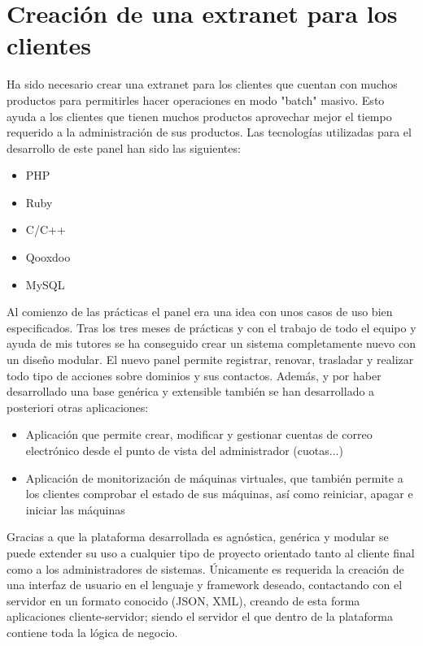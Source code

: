 \documentclass[12pt]{article}
\begin{document}
  \section{Creación de una extranet para los clientes}
    Ha sido necesario crear una extranet para los clientes que cuentan con muchos productos para
    permitirles hacer operaciones en modo "batch" masivo. Esto ayuda a los clientes que tienen
    muchos productos aprovechar mejor el tiempo requerido a la administración de sus productos.
    Las tecnologías utilizadas para el desarrollo de este panel han sido las siguientes:
    \begin{itemize}
      \item PHP
      \item Ruby
      \item C/C++
      \item Qooxdoo
      \item MySQL
    \end{itemize}
    Al comienzo de las prácticas el panel era una idea con unos casos de uso bien especificados.
    Tras los tres meses de prácticas y con el trabajo de todo el equipo y ayuda de mis tutores se
    ha conseguido crear un sistema completamente nuevo con un diseño modular.
    El nuevo panel permite registrar, renovar, trasladar y realizar todo tipo de acciones sobre
    dominios y sus contactos. Además, y por haber desarrollado una base genérica y extensible
    también se han desarrollado a posteriori otras aplicaciones:
    \begin{itemize}
      \item Aplicación que permite crear, modificar y gestionar cuentas de correo electrónico desde
            el punto de vista del administrador (cuotas...)
      \item Aplicación de monitorización de máquinas virtuales, que también permite a los clientes
            comprobar el estado de sus máquinas, así como reiniciar, apagar e iniciar las máquinas
    \end{itemize}
    Gracias a que la plataforma desarrollada es agnóstica, genérica y modular se puede extender su
    uso a cualquier tipo de proyecto orientado tanto al cliente final como a los administradores de
    sistemas. Únicamente es requerida la creación de una interfaz de usuario en el lenguaje y
    framework deseado, contactando con el servidor en un formato conocido (JSON, XML), creando de
    esta forma aplicaciones cliente-servidor; siendo el servidor el que dentro de la plataforma
    contiene toda la lógica de negocio.
\end{document}

